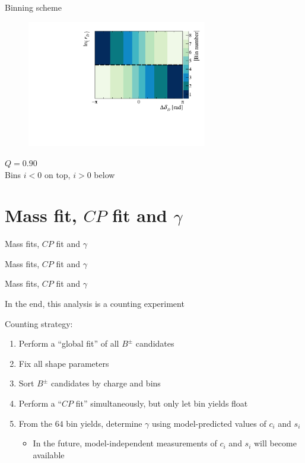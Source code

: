 \documentclass{beamer}
\begin{document}
\begin{frame}{Binning scheme}
  \begin{figure}
    \centering
    \includegraphics[width = 0.7\textwidth]{Plots/BinningSchemePlot_8Bins.pdf}
  \end{figure}
  \vspace{-1.0cm}
  \begin{center}
    $Q = 0.90$ \\
    Bins $i < 0$ on top, $i > 0$ below
  \end{center}
\end{frame}

\section{Mass fit, \texorpdfstring{$C\!P$}{CP} fit and \texorpdfstring{$\gamma$}{gamma}}
\begin{frame}{Mass fits, $C\!P$ fit and $\gamma$}
  \begin{center}
    {\huge Mass fits, $C\!P$ fit and $\gamma$}
  \end{center}
\end{frame}

\begin{frame}{Mass fits, $C\!P$ fit and $\gamma$}
  \begin{center}
    \large In the end, this analysis is a counting experiment
  \end{center}
  Counting strategy:
  \begin{enumerate}
    \setlength\itemsep{1.0em}
    \item{Perform a ``global fit'' of all $B^\pm$ candidates}
    \item{Fix all shape parameters}
    \item{Sort $B^\pm$ candidates by charge and bins}
    \item{Perform a ``$C\!P$ fit'' simultaneously, but only let bin yields float}
    \item{From the $64$ bin yields, determine $\gamma$ using model-predicted values of $c_i$ and $s_i$}
    \begin{itemize}
      \item{In the future, model-independent measurements of $c_i$ and $s_i$ will become available}
    \end{itemize}
  \end{enumerate}
\end{frame}
\end{document}
